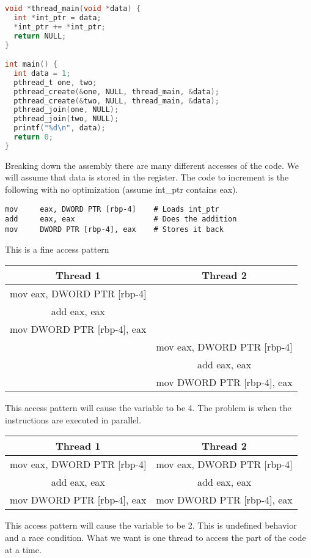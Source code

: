 \begin{lstlisting}[language=C]
void *thread_main(void *data) {
  int *int_ptr = data;
  *int_ptr += *int_ptr;
  return NULL;
}

int main() {
  int data = 1;
  pthread_t one, two;
  pthread_create(&one, NULL, thread_main, &data);
  pthread_create(&two, NULL, thread_main, &data);
  pthread_join(one, NULL);
  pthread_join(two, NULL);
  printf("%d\n", data);
  return 0;
}
\end{lstlisting}

Breaking down the assembly there are many different accesses of the code.
We will assume that data is stored in the  register.
The code to increment is the following with no optimization (assume int\_ptr contains eax).

\begin{verbatim}
mov     eax, DWORD PTR [rbp-4]    # Loads int_ptr
add     eax, eax                  # Does the addition
mov     DWORD PTR [rbp-4], eax    # Stores it back
\end{verbatim}

This is a fine access pattern

\begin{tabular}{| c | c |}
  Thread 1 & Thread 2 \\ \hline
mov     eax, DWORD PTR [rbp-4] & \\
add     eax, eax & \\
mov     DWORD PTR [rbp-4], eax & \\ \hline
& mov     eax, DWORD PTR [rbp-4] \\
& add     eax, eax \\
& mov     DWORD PTR [rbp-4], eax \\ \hline
\end{tabular}

This access pattern will cause the variable  to be 4.
The problem is when the instructions are executed in parallel.

\begin{tabular}{| c | c |}
  Thread 1 & Thread 2 \\ \hline
mov     eax, DWORD PTR [rbp-4] & mov     eax, DWORD PTR [rbp-4] \\
add     eax, eax & add     eax, eax \\
mov     DWORD PTR [rbp-4], eax & mov     DWORD PTR [rbp-4], eax \\
\end{tabular}

This access pattern will cause the variable  to be 2.
This is undefined behavior and a race condition.
What we want is one thread to access the part of the code at a time.

